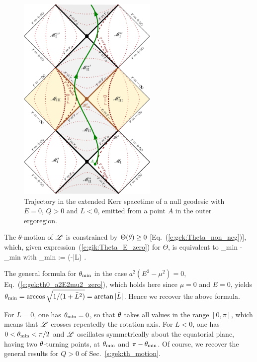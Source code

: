 \begin{figure}
\centerline{\includegraphics[width=0.6\textwidth]{gik_zero_ener_traj.pdf}}
\caption[]{\label{f:gik:zero_ener_traj} \footnotesize
Trajectory in the extended Kerr spacetime of a null geodesic
with $E=0$, $Q>0$ and $L<0$, emitted from a point $A$ in the outer ergoregion.
}
\end{figure}

The $\theta$-motion of $\mathscr{L}$ is constrained by $\Theta(\theta) \geq 0$ [Eq.~(\ref{e:gek:Theta_non_neg})],
which, given expression~(\ref{e:gik:Theta_E_zero}) for $\Theta$, is
equivalent to
\be
    \th_{\rm min} \leq \th \leq \pi - \th_{\rm min} \quad\mbox{with}\quad
    \th_{\rm min} := \arctan (-\bar{L}) .
\ee
\begin{remark}
The general formula for $\theta_{\rm min}$ in the case
$a^2(E^2 - \mu^2) = 0$, Eq.~(\ref{e:gek:th0_a2E2mu2_zero}), which holds here since $\mu=0$ and $E=0$,
yields $\theta_{\rm min} = \arccos\sqrt{1/(1+ \bar{L}^2)} = \arctan | \bar{L} |$.
Hence we recover the above formula.
\end{remark}
For $L = 0$, one has $\theta_{\rm min} = 0$, so that $\theta$ takes all values in the
range $[0,\pi]$, which means that $\mathscr{L}$
crosses repeatedly the rotation axis. For $L< 0$, one has $0 < \theta_{\rm min} < \pi/2$ and
$\mathscr{L}$ oscillates symmetrically about the equatorial plane,
having two $\theta$-turning points, at $\theta_{\rm min} $ and $\pi-\theta_{\rm min}$. Of course, we
recover the general results for $Q>0$ of Sec.~\ref{s:gek:th_motion}.

